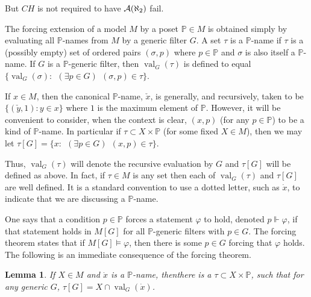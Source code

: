 \documentclass{amsart}
\theoremstyle{plain}
\newtheorem{lemma}[theorem]{Lemma}
\theoremstyle{definition}
\theoremstyle{remark}
\theoremstyle{plain}
\theoremstyle{definition}
\theoremstyle{remark}
\def\val{\operatorname{val}}
\begin{document}
  But \(CH\) is not required to have \(\mathcal{A}(\aleph_2)\) fail.



            The forcing extension of a model $M$ by a poset $\mathbb P\in M$ is
            obtained simply by evaluating all $\mathbb P$-names from $M$ by a
            generic filter $G$.
             A set $\tau$ is a $\mathbb P$-name if $\tau$ is a
             (possibly empty)
            set of ordered pairs $(\sigma,p)$ where $p\in \mathbb P$ and
             $\sigma$ is also itself a $\mathbb P$-name.
            If $G$ is a $\mathbb P$-generic filter, then
             $\val_G(\tau) $ is defined to equal
              $\{ \val_G(\sigma) : ~~(\exists p\in G)~~(\sigma,p)\in \tau\}$.

            If $x\in M$, then the canonical
            $\mathbb P$-name, $\check x$, is generally, and recursively,
             taken to be
             $\{ (\check y, 1) : y\in x\}$ where $1$ is the maximum element of
             $\mathbb P$.  However, it will be convenient to consider, when the
            context is clear, $(x,p)$ (for any $p\in \mathbb P$)
            to be a kind of $\mathbb P$-name.
            In particular
            if $\tau \subset X\times \mathbb P$ (for some fixed $X\in M$),
            then we may let $\tau[G] = \{ x : ~~(\exists p\in
            G)~~(x,p)\in\tau\}$.


            Thus,  $\val_G(\tau)$ will denote the recursive evaluation by $G$ and
             $\tau[G]$ will be defined as above.
            In fact, if $\tau\in M$ is any set then each of
             $\val_G(\tau)$ and $\tau[G]$ are well defined.
            It is a standard convention to use a dotted letter, such
            as $\dot x$, to indicate that we are discussing a $\mathbb P$-name.

            One says that a condition $p\in \mathbb P$ forces a statement
            $\varphi$
              to hold, denoted $p\Vdash \varphi$,
            if that statement holds in $M[G]$ for all $\mathbb P$-generic filters
            with $p\in G$. The forcing theorem states that if $M[G]\models
            \varphi$,
             then there is some $p\in G$ forcing that $\varphi$ holds.
            The following is an immediate consequence of the forcing theorem.

            \begin{lemma} If $X\in M$ and $\dot x$ is a $\mathbb P$-name,
            then\label{easyname}
             there is a $\tau\subset X\times \mathbb P$, such that
            for any generic $G$, $\tau[G] = X\cap \val_G(\dot x)$.
            \end{lemma}
\end{document}
